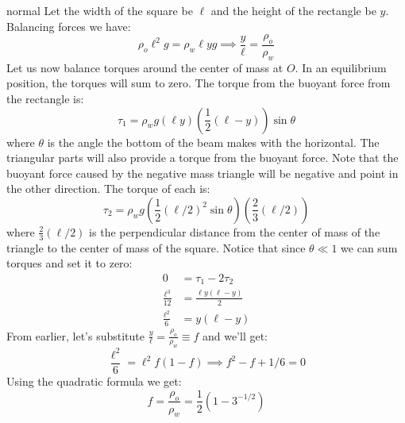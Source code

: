 \begin{solution}{normal}
Let the width of the square be $\ell$ and the height of the rectangle be $y$. Balancing forces we have:
$$\rho_o \ell^2 g = \rho_w \ell y g \implies \frac{y}{\ell} = \frac{\rho_o}{\rho_w}$$
Let us now balance torques around the center of mass at $O$. In an equilibrium position, the torques will sum to zero. The torque from the buoyant force from the rectangle is:$$\tau_1 = \rho_w g\left( \ell y\right) \left(\frac{1}{2}(\ell-y)\right) \sin\theta$$where $\theta$ is the angle the bottom of the beam makes with the horizontal. The triangular parts will also provide a torque from the buoyant force. Note that the buoyant force caused by the negative mass triangle will be negative and point in the other direction. The torque of each is:
$$\tau_2 = \rho_w g \left(\frac{1}{2}(\ell/2)^2\sin\theta\right)\left(\frac{2}{3}(\ell/2)\right)$$where $\frac{2}{3}(\ell/2)$ is the perpendicular distance from the center of mass of the triangle to the center of mass of the square. Notice that since $\theta \ll 1$ we can sum torques and set it to zero:
\begin{align*}
0 &= \tau_1 - 2\tau_2 \\
\frac{\ell^3}{12} &= \frac{\ell y(\ell-y)}{2} \\
\frac{\ell^2}{6} &=y(\ell-y)
\end{align*}From earlier, let's substitute $\frac{y}{\ell}=\frac{\rho_o}{\rho_w} \equiv f$ and we'll get:
$$\frac{\ell^2}{6} = \ell^2 f(1-f) \implies f^2 -f + 1/6 = 0$$Using the quadratic formula we get:
$$f =\frac{\rho_o}{\rho_w} = \boxed{\frac{1}{2}\left(1-3^{-1/2}\right)}$$
\end{solution}
